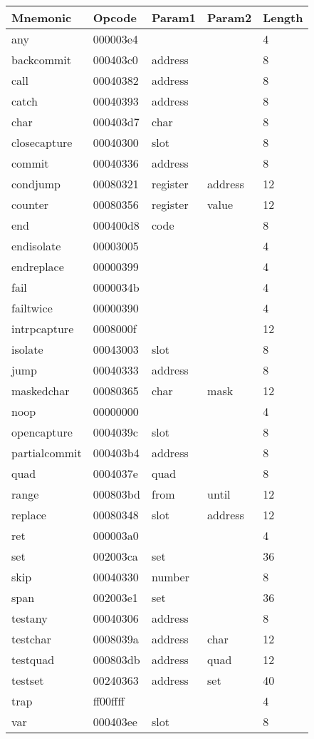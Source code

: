 
\begin{center}
\label{tab:naig_bytecode}
\begin{longtable}{lllll}
\textbf{Mnemonic} & \textbf{Opcode} & \textbf{Param1} & \textbf{Param2} & \textbf{Length} \\
\endhead
any & 000003e4 &  &   & 4 \\
backcommit & 000403c0 & address &   & 8 \\
call & 00040382 & address &   & 8 \\
catch & 00040393 & address &   & 8 \\
char & 000403d7 & char &   & 8 \\
closecapture & 00040300 & slot &   & 8 \\
commit & 00040336 & address &   & 8 \\
condjump & 00080321 & register & address  & 12 \\
counter & 00080356 & register & value  & 12 \\
end & 000400d8 & code &   & 8 \\
endisolate & 00003005 &  &   & 4 \\
endreplace & 00000399 &  &   & 4 \\
fail & 0000034b &  &   & 4 \\
failtwice & 00000390 &  &   & 4 \\
intrpcapture & 0008000f &  &   & 12 \\
isolate & 00043003 & slot &   & 8 \\
jump & 00040333 & address &   & 8 \\
maskedchar & 00080365 & char & mask  & 12 \\
noop & 00000000 &  &   & 4 \\
opencapture & 0004039c & slot &   & 8 \\
partialcommit & 000403b4 & address &   & 8 \\
quad & 0004037e & quad &   & 8 \\
range & 000803bd & from & until  & 12 \\
replace & 00080348 & slot & address  & 12 \\
ret & 000003a0 &  &   & 4 \\
set & 002003ca & set &   & 36 \\
skip & 00040330 & number &   & 8 \\
span & 002003e1 & set &   & 36 \\
testany & 00040306 & address &   & 8 \\
testchar & 0008039a & address & char  & 12 \\
testquad & 000803db & address & quad  & 12 \\
testset & 00240363 & address & set  & 40 \\
trap & ff00ffff &  &   & 4 \\
var & 000403ee & slot &   & 8 \\
\end{longtable}
\end{center}
